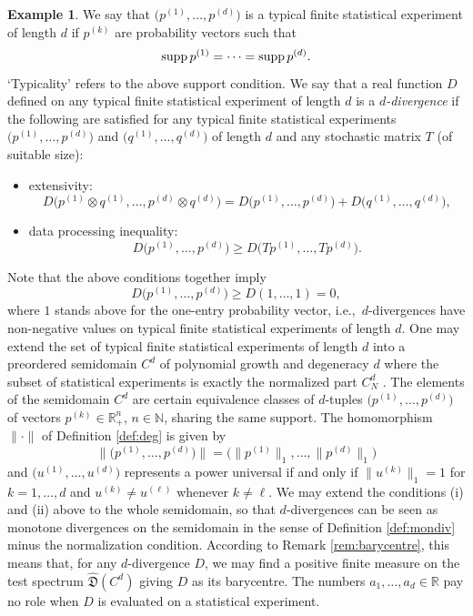 \documentclass[12pt,a4paper,reqno]{amsart}
\theoremstyle{definition}
\newtheorem{example}[proposition]{Example}
\newcommand{\mf}[1]{\mathfrak{#1}}
\newcommand{\N}{\mathbb N}
\newcommand{\R}{\mathbb R}
\begin{document}
\begin{example}\label{ex:classical}
We say that $\big(p^{(1)},\ldots,p^{(d)}\big)$ is a typical finite statistical experiment of length $d$ if $p^{(k)}$ are probability vectors such that
$$
{\rm supp}\,p^{(1)}=\cdots={\rm supp}\,p^{(d)}.
$$
`Typicality' refers to the above support condition. We say that a real function $D$ defined on any typical finite statistical experiment of length $d$ is a {\it $d$-divergence} if the following are satisfied for any typical finite statistical experiments $\big(p^{(1)},\ldots,p^{(d)}\big)$ and $\big(q^{(1)},\ldots,q^{(d)}\big)$ of length $d$ and any stochastic matrix $T$ (of suitable size):
\begin{itemize}
\item[(i)] extensivity:
$$
D\big(p^{(1)}\otimes q^{(1)},\ldots,p^{(d)}\otimes q^{(d)}\big)=D\big(p^{(1)},\ldots,p^{(d)}\big)+D\big(q^{(1)},\ldots,q^{(d)}\big),
$$
\item[(ii)] data processing inequality:
$$
D\big(p^{(1)},\ldots,p^{(d)}\big)\geq D\big(Tp^{(1)},\ldots,Tp^{(d)}\big).
$$
\end{itemize}
Note that the above conditions together imply
$$
D\big(p^{(1)},\ldots,p^{(d)}\big)\geq D(1,\ldots,1)=0,
$$
where $1$ stands above for the one-entry probability vector, i.e.,\ $d$-divergences have non-negative values on typical finite statistical experiments of length $d$. One may extend the set of typical finite statistical experiments of length $d$ into a preordered semidomain $C^d$ of polynomial growth and degeneracy $d$ where the subset of statistical experiments is exactly the normalized part $C^d_N$ \cite{Farooq_et_al_2024}. The elements of the semidomain $C^d$ are certain equivalence classes of $d$-tuples $\big(p^{(1)},\ldots,p^{(d)}\big)$ of vectors $p^{(k)}\in\R_+^n$, $n\in\N$, sharing the same support. The homomorphism $\|\cdot\|$ of Definition \ref{def:deg} is given by
$$
\big\|\big(p^{(1)},\ldots,p^{(d)}\big)\big\|=\big(\big\|p^{(1)}\big\|_1,\ldots,\big\|p^{(d)}\big\|_1\big)
$$
and $\big(u^{(1)},\ldots,u^{(d)}\big)$ represents a power universal if and only if $\big\|u^{(k)}\big\|_1=1$ for $k=1,\ldots,d$ and $u^{(k)}\neq u^{(\ell)}$ whenever $k\neq\ell$. We may extend the conditions (i) and (ii) above to the whole semidomain, so that $d$-divergences can be seen as monotone divergences on the semidomain in the sense of Definition \ref{def:mondiv} minus the normalization condition. According to Remark \ref{rem:barycentre}, this means that, for any $d$-divergence $D$, we may find a positive finite measure on the test spectrum $\hat{\mf D}(C^d)$ giving $D$ as its barycentre. The numbers $a_1,\ldots,a_d\in\R$ pay no role when $D$ is evaluated on a statistical experiment.


\end{example}
\end{document}
